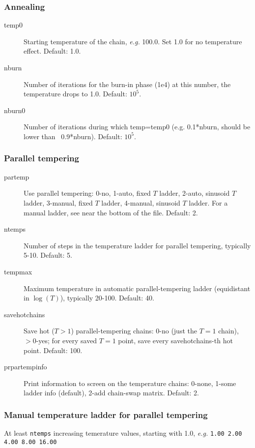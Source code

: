 \documentclass[10pt]{article}
\begin{document}
\subsubsection{Annealing}
\begin{description}
\item[temp0] Starting temperature of the chain, \textit{e.g.} 100.0. Set 1.0 for no temperature effect.  Default: 1.0.
\item[nburn] Number of iterations for the burn-in phase (1e4) at this number, the temperature drops to 1.0.  Default: $10^5$.
\item[nburn0] Number of iterations during which temp=temp0 (e.g. 0.1*nburn, should be lower than ~0.9*nburn).  Default: $10^5$.
\end{description}

\subsubsection{Parallel tempering}
\begin{description}
\item[partemp] Use parallel tempering:  0-no,  1-auto, fixed $T$ ladder,  2-auto, sinusoid $T$ ladder,  3-manual, fixed $T$ ladder,  4-manual, sinusoid $T$ ladder.  For a manual ladder, see near the bottom of the file.  Default: 2.
\item[ntemps] Number of steps in the temperature ladder for parallel tempering, typically 5-10.  Default: 5.
\item[tempmax] Maximum temperature in automatic parallel-tempering ladder (equidistant in $\log(T)$), typically 20-100.  Default: 40.
\item[savehotchains] Save hot ($T>1$) parallel-tempering chains: 0-no (just the $T=1$ chain), $>0$-yes; for every saved $T=1$ point, save every savehotchains-th hot point.  Default: 100.
\item[prpartempinfo] Print information to screen on the temperature chains: 0-none, 1-some ladder info (default), 2-add chain-swap matrix.  Default: 2.
\end{description}

\subsubsection{Manual temperature ladder for parallel tempering}
At least \texttt{ntemps} increasing temerature values, starting with 1.0, \textit{e.g.} \texttt{1.00     2.00     4.00     8.00     16.00}
    
\end{document}
